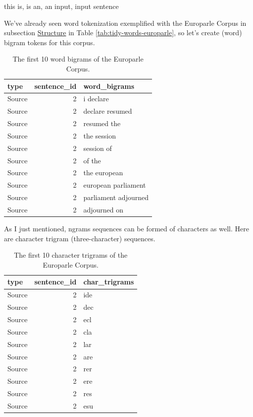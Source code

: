 \documentclass[
]{article}
\begin{document}
this is, is an, an input, input sentence

We've already seen word tokenization exemplified with the Europarle Corpus in subsection \protect\hyperlink{structure}{Structure} in Table \ref{tab:tidy-words-europarle}, so let's create (word) bigram tokens for this corpus.

\begin{table}

\caption{\label{tab:recoding-tokenization-europarle-bigram-words}The first 10 word bigrams of the Europarle Corpus.}
\centering
\begin{tabular}[t]{lrl}
\toprule
type & sentence\_id & word\_bigrams\\
\midrule
Source & 2 & i declare\\
Source & 2 & declare resumed\\
Source & 2 & resumed the\\
Source & 2 & the session\\
Source & 2 & session of\\
\addlinespace
Source & 2 & of the\\
Source & 2 & the european\\
Source & 2 & european parliament\\
Source & 2 & parliament adjourned\\
Source & 2 & adjourned on\\
\bottomrule
\end{tabular}
\end{table}

As I just mentioned, ngrams sequences can be formed of characters as well. Here are character trigram (three-character) sequences.

\begin{table}

\caption{\label{tab:recoding-tokenization-europarle-trigram-chars}The first 10 character trigrams of the Europarle Corpus.}
\centering
\begin{tabular}[t]{lrl}
\toprule
type & sentence\_id & char\_trigrams\\
\midrule
Source & 2 & ide\\
Source & 2 & dec\\
Source & 2 & ecl\\
Source & 2 & cla\\
Source & 2 & lar\\
\addlinespace
Source & 2 & are\\
Source & 2 & rer\\
Source & 2 & ere\\
Source & 2 & res\\
Source & 2 & esu\\
\bottomrule
\end{tabular}
\end{table}
\end{document}
